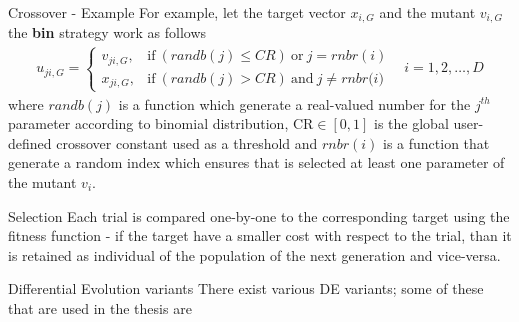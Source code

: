 \documentclass[xcolor={usenames}]{beamer}
\begin{document}
  \begin{frame}{Crossover - Example}
  	For example, let the target vector $x_{i,G}$ and the mutant $v_{i,G}$ the \textbf{bin} strategy work as follows
\begin{align}
	u_{ji, G} = \begin{cases}
		v_{ji,G}, & \textrm{if}\ (\textit{randb}(j) \leq \textit{CR})\ \textrm{or}\ j=\textit{rnbr}(i)\\
		x_{ji,G}, & \textrm{if}\ (\textit{randb}(j) > \textit{CR})\ \textrm{and}\ j\neq\textit{rnbr(i)}
	\end{cases} & i=1,2,\dots,D
\end{align}
where  $\textit{randb}(j)$ is a function which generate a real-valued number for the $j^{th}$ parameter according to binomial distribution, $\textrm{CR}\in[0,1]$ is the global user-defined crossover constant used as a threshold and $\textit{rnbr}(i)$ is a function that generate a random index which ensures that is selected at least one parameter of the mutant $v_{i}$.
  \end{frame}
  \begin{frame}{Selection}
	Each trial is compared one-by-one to the corresponding target using the fitness function - if the target have a smaller cost with respect to the trial, than it is retained as individual of the population of the next generation and vice-versa.
  \end{frame}
  \begin{frame}{Differential Evolution variants}
  	There exist various DE variants; some of these that are used in the thesis are
  	\begin{itemize}
  	\end{itemize}
  \end{frame}
\end{document}
